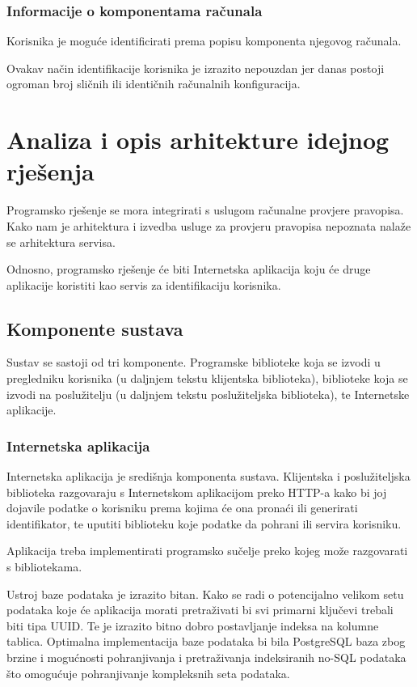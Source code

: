 \documentclass[times, utf8, zavrsni]{fer}
\begin{document}
\subsection{Informacije o komponentama računala}
Korisnika je moguće identificirati prema popisu komponenta njegovog
računala.

Ovakav način identifikacije korisnika je izrazito nepouzdan jer danas
postoji ogroman broj sličnih ili identičnih računalnih konfiguracija.

\chapter{Analiza i opis arhitekture idejnog rješenja}
Programsko rješenje se mora integrirati s uslugom računalne provjere
pravopisa. Kako nam je arhitektura i izvedba usluge za provjeru pravopisa
nepoznata nalaže se arhitektura servisa.

Odnosno, programsko rješenje će biti Internetska aplikacija koju će druge
aplikacije koristiti kao servis za identifikaciju korisnika.

\section{Komponente sustava}
Sustav se sastoji od tri komponente. Programske biblioteke koja se izvodi u
pregledniku korisnika (u daljnjem tekstu klijentska biblioteka),
biblioteke koja se izvodi na poslužitelju (u daljnjem tekstu poslužiteljska
biblioteka), te Internetske aplikacije.

\subsection{Internetska aplikacija}
Internetska aplikacija je središnja komponenta sustava. Klijentska i
poslužiteljska biblioteka razgovaraju s Internetskom aplikacijom preko HTTP-a
kako bi joj dojavile podatke o korisniku prema kojima će ona pronaći ili
generirati identifikator, te uputiti biblioteku koje podatke da pohrani ili
servira korisniku.

Aplikacija treba implementirati programsko sučelje preko kojeg može razgovarati
s bibliotekama.

Ustroj baze podataka je izrazito bitan. Kako se radi o potencijalno velikom setu
podataka koje će aplikacija morati pretraživati bi svi primarni ključevi trebali
biti tipa UUID. Te je izrazito bitno dobro postavljanje indeksa na kolumne
tablica. Optimalna implementacija baze podataka bi bila PostgreSQL baza zbog
brzine i mogućnosti pohranjivanja i pretraživanja indeksiranih no-SQL podataka
što omogućuje pohranjivanje kompleksnih seta podataka.
\end{document}
